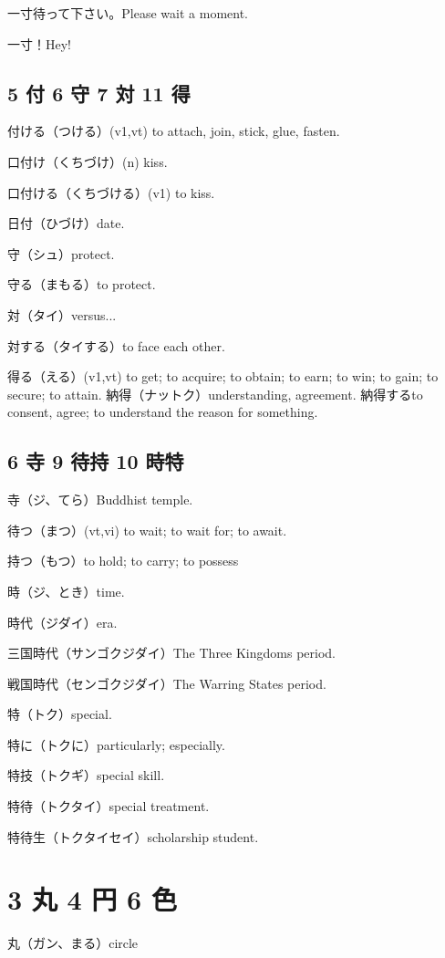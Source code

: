 一寸待って下さい。Please wait a moment.

一寸！Hey!

\subsection{5 付 6 守 7 対 11 得}

付ける（つける）(v1,vt) to attach, join, stick, glue, fasten.

口付け（くちづけ）(n) kiss.

口付ける（くちづける）(v1) to kiss.

日付（ひづけ）date.

守（シュ）protect.

守る（まもる）to protect.

対（タイ）versus...

対する（タイする）to face each other.

得る（える）(v1,vt) to get; to acquire; to obtain; to earn; to win; to gain; to secure; to attain.
納得（ナットク）understanding, agreement.
納得するto consent, agree; to understand the reason for something.

\subsection{6 寺 9 待持 10 時特}

寺（ジ、てら）Buddhist temple.

待つ（まつ）(vt,vi) to wait; to wait for; to await.

持つ（もつ）to hold; to carry; to possess

時（ジ、とき）time.

時代（ジダイ）era.

三国時代（サンゴクジダイ）The Three Kingdoms period.

戦国時代（センゴクジダイ）The Warring States period.

特（トク）special.

特に（トクに）particularly; especially.

特技（トクギ）special skill.

特待（トクタイ）special treatment.

特待生（トクタイセイ）scholarship student.

\section{3 丸 4 円 6 色}

丸（ガン、まる）circle

